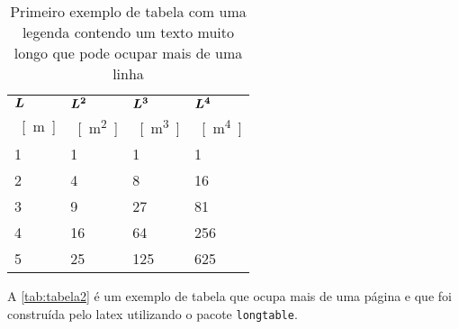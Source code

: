\begin{table}[htb]%
\caption{Primeiro exemplo de tabela com uma legenda contendo um texto muito longo que pode ocupar mais de uma linha}%
\label{tab:tabela1}%
\begin{tabularx}{\textwidth}{@{\extracolsep{\fill}}llll}%
\toprule
$\boldsymbol{L}$ & $\boldsymbol{L^2}$ & $\boldsymbol{L^3}$ & $\boldsymbol{L^4}$ \\
\SI{}{[m]} & \SI{}{[m^2]} & \SI{}{[m^3]} & \SI{}{[m^4]} \\ \midrule
1          & 1            & 1            & 1            \\
2          & 4            & 8            & 16           \\
3          & 9            & 27           & 81           \\
4          & 16           & 64           & 256          \\
5          & 25           & 125          & 625          \\ \bottomrule
\end{tabularx}
\fonte{}%
\end{table}

A \autoref{tab:tabela2} é um exemplo de tabela que ocupa mais de uma página e que foi construída pelo \gls{latex} utilizando o pacote \texttt{longtable}.

